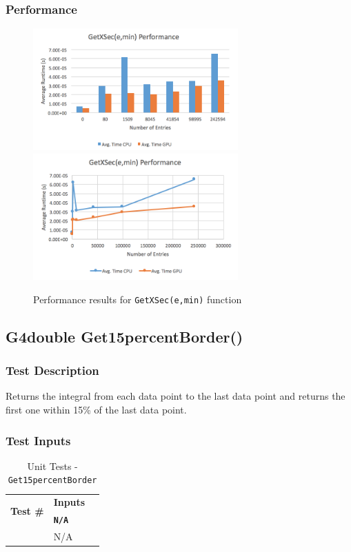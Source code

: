 \documentclass[12pt]{article}
\newcounter{TestCounter}
\begin{document}
	\subsubsection{Performance}
		\begin{figure}[H]
    	\centering
    	\caption{Performance results for \texttt{GetXSec(e,min)} function}\label{figPerformanceGetXSec_e_min}
    	\includegraphics[width=0.7\textwidth]{getxsec_e_min_bar.png}
    	\includegraphics[width=0.7\textwidth]{getxsec_e_min_line.png}
    	\end{figure}

\subsection{G4double Get15percentBorder()}
	\subsubsection{Test Description}
	 Returns the integral from each data point to the last data point and returns the first one within 
15\% of the last data point.
	
	\subsubsection{Test Inputs}
		\begin{table}[H]
		\centering
		\caption{Unit Tests - \texttt{Get15percentBorder}}\label{Get15percentBorder_unit}
		\begin{tabular}{lll}
		\toprule
		\multirow{2}{*}{\bf Test \#}  & \multicolumn{1}{c}{\bf Inputs}\\
		& \bf \texttt{N/A}\\\midrule
		{TestCounter}\arabic{TestCounter}\label{Get15percentBorder_0} & N/A \\
		\bottomrule
		\end{tabular}
		\end{table}
	
\end{document}
